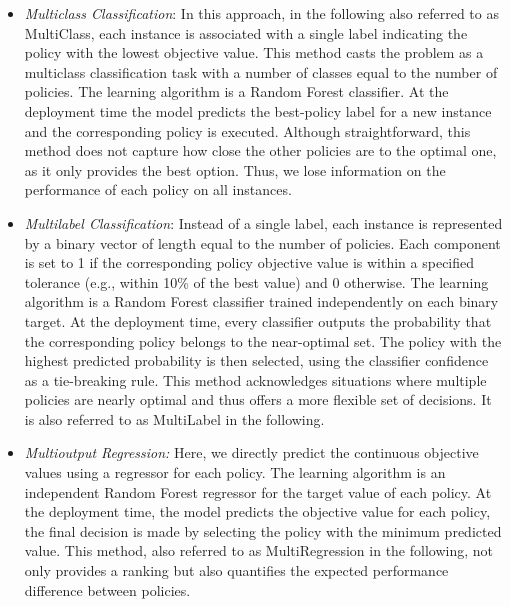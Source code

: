 \documentclass[preprint,11pt,authoryear]{elsarticle}
\begin{document}
\begin{itemize}
    \item \textit{Multiclass Classification}: 
    In this approach, in the following also referred to as MultiClass, each instance is associated with a single label indicating the policy with the lowest objective value. This method casts the problem as a multiclass classification task with a number of classes equal to the number of policies. The learning algorithm is a Random Forest classifier. At the deployment time the model predicts the best-policy label for a new instance and the corresponding policy is executed. Although straightforward, this method does not capture how close the other policies are to the optimal one, as it only provides the best option. Thus, we lose information on the performance of each policy on all instances.

    \item \textit{Multilabel Classification}:
    Instead of a single label, each instance is represented by a binary vector of length equal to the number of policies. Each component is set to 1 if the corresponding policy objective value is within a specified tolerance (e.g., within 10\% of the best value) and 0 otherwise. The learning algorithm is a Random Forest classifier trained independently on each binary target. At the deployment time, every classifier outputs the probability that the corresponding policy belongs to the near-optimal set. The policy with the highest predicted probability is then selected, using the classifier confidence as a tie-breaking rule. This method acknowledges situations where multiple policies are nearly optimal and thus offers a more flexible set of decisions. It is also referred to as MultiLabel in the following.

    \item \textit{Multioutput Regression:}
    Here, we directly predict the continuous objective values using a regressor for each policy. The learning algorithm is an independent Random Forest regressor for the target value of each policy. At the deployment time, the model predicts the objective value for each policy, the final decision is made by selecting the policy with the minimum predicted value. This method, also referred to as MultiRegression in the following, not only provides a ranking but also quantifies the expected performance difference between policies. 
    
    

\end{itemize}
\end{document}
